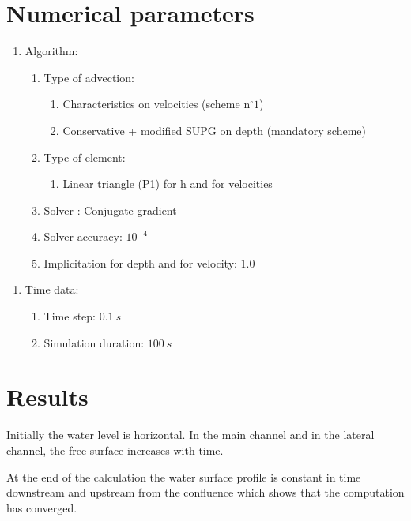\section{Numerical parameters}
%
\begin{enumerate}
  \item[] Algorithm:
  \begin{enumerate}
      \item[\textendash] Type of advection:
      \begin{enumerate}
          \item[\textbullet] Characteristics on velocities (scheme n$^{\circ}1$)
          \item[\textbullet] Conservative + modified SUPG on depth (mandatory scheme)
      \end{enumerate}
      \item[\textendash] Type of element:

      \begin{enumerate}
          \item[\textbullet] Linear triangle (P1) for h and for velocities
      \end{enumerate}
      \item[\textendash] Solver : Conjugate gradient
      \item[\textendash] Solver accuracy: $10^{-4}$
      \item[\textendash] Implicitation for depth and for velocity: $1.0$
  \end{enumerate}
\end{enumerate}
%
\begin{enumerate}
  \item[] Time data:
  \begin{enumerate}
      \item[\textendash] Time step: $0.1~s$
      \item[\textendash] Simulation duration: $100~s$
  \end{enumerate}
\end{enumerate}
%
%
%
\section{Results}
%
Initially the water level is horizontal.
In the main channel and in the lateral channel, the free surface increases with
time.

At the end of the calculation the water surface profile is constant in time
downstream and upstream from the confluence which shows that the computation has
converged.

